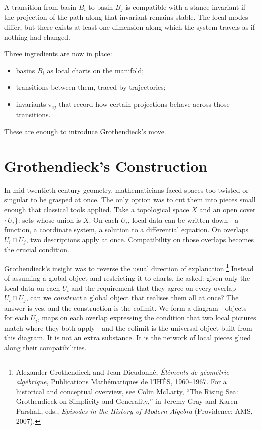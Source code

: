\documentclass[12pt,a4paper]{article}
\begin{document}
A transition from basin $B_i$ to basin $B_j$ is compatible with a stance invariant if the projection of the path along that invariant remains stable. The local modes differ, but there exists at least one dimension along which the system travels as if nothing had changed.

Three ingredients are now in place:

\begin{itemize}
  \item basins $B_i$ as local charts on the manifold;
  \item transitions between them, traced by trajectories;
  \item invariants $\pi_{ij}$ that record how certain projections behave across those transitions.
\end{itemize}

These are enough to introduce Grothendieck's move.

\section{Grothendieck's Construction}

In mid-twentieth-century geometry, mathematicians faced spaces too twisted or singular to be grasped at once. The only option was to cut them into pieces small enough that classical tools applied. Take a topological space $X$ and an open cover $\{U_i\}$: sets whose union is $X$. On each $U_i$, local data can be written down---a function, a coordinate system, a solution to a differential equation. On overlaps $U_i \cap U_j$, two descriptions apply at once. Compatibility on those overlaps becomes the crucial condition.

Grothendieck's insight was to reverse the usual direction of explanation.\footnote{Alexander Grothendieck and Jean Dieudonné, \emph{Éléments de géométrie algébrique}, Publications Mathématiques de l'IHÉS, 1960--1967. For a historical and conceptual overview, see Colin McLarty, ``The Rising Sea: Grothendieck on Simplicity and Generality,'' in Jeremy Gray and Karen Parshall, eds., \emph{Episodes in the History of Modern Algebra} (Providence: AMS, 2007).} Instead of assuming a global object and restricting it to charts, he asked: given only the local data on each $U_i$ and the requirement that they agree on every overlap $U_i \cap U_j$, can we \emph{construct} a global object that realises them all at once? The answer is yes, and the construction is the colimit. We form a diagram---objects for each $U_i$, maps on each overlap expressing the condition that two local pictures match where they both apply---and the colimit is the universal object built from this diagram. It is not an extra substance. It is the network of local pieces glued along their compatibilities.
\end{document}
